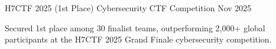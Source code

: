 \resumeProject
  {H7CTF 2025 (1st Place)}
  {Cybersecurity CTF Competition}
  {Nov 2025}
  {{} }
\resumeItemListStart
  \item Secured 1st place among 30 finalist teams, outperforming 2,000+ global participants at the H7CTF 2025 Grand Finale cybersecurity competition.
\resumeItemListEnd
